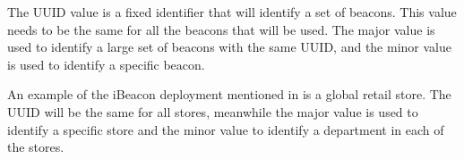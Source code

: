 The UUID value is a fixed identifier that will identify a set of beacons.
This value needs to be the same for all the beacons that will be used.
The major value is used to identify a large set of beacons with the same UUID, and the minor value is used to identify a specific beacon.
\cite{GettingStartedIBeacon2014}

\bigskip

An example of the iBeacon deployment mentioned in \cite{GettingStartedIBeacon2014} is a global retail store. The UUID will be the same for all stores, meanwhile the major value is used to identify a specific store and the minor value to identify a department in each of the stores.
\cite{GettingStartedIBeacon2014} 

